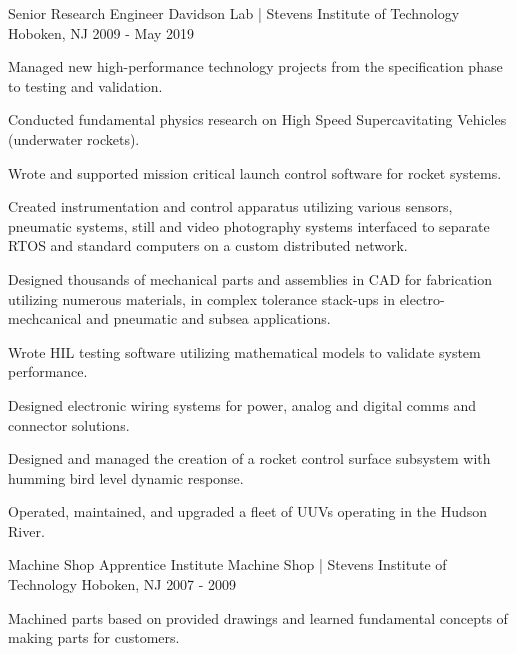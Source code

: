 \begin{cventries}
  \cventry
    {Senior Research Engineer} %
    {Davidson Lab | Stevens Institute of Technology} %
    {Hoboken, NJ} %
    {2009 - May 2019} %
    {
      \begin{cvitems} %
        \item {Managed new high-performance technology projects from the specification phase to testing and validation.} 
        \item {Conducted fundamental physics research on High Speed Supercavitating Vehicles (underwater rockets).}
        \item {Wrote and supported mission critical launch control software for rocket systems.} 
        \item {Created instrumentation and control apparatus utilizing various sensors, pneumatic systems, still and video photography systems interfaced to separate RTOS and standard computers on a custom distributed network.} 
        \item {Designed thousands of mechanical parts and assemblies in CAD for fabrication utilizing numerous materials, in complex tolerance stack-ups in electro-mechcanical and pneumatic and subsea applications.}
        \item {Wrote HIL testing software utilizing mathematical models to validate system performance.} 
        \item {Designed electronic wiring systems for power, analog and digital comms and connector solutions.}
        \item {Designed and managed the creation of a rocket control surface subsystem with humming bird level dynamic response.}
        \item {Operated, maintained, and upgraded a fleet of UUVs operating in the Hudson River.}
      \end{cvitems}
    }


  \cventry
    {Machine Shop Apprentice} %
    {Institute Machine Shop | Stevens Institute of Technology} %
    {Hoboken, NJ} %
    {2007 - 2009} %
    {%
      \begin{cvitems} %
        \item {Machined parts based on provided drawings and learned fundamental concepts of making parts for customers.}
      \end{cvitems}
    }

\end{cventries}
